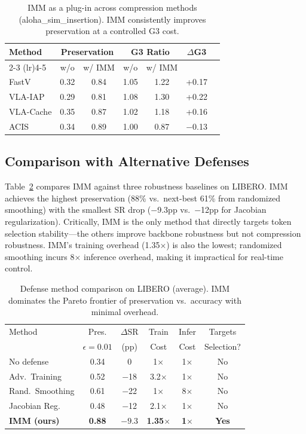 \documentclass[10pt,twocolumn]{article}
\begin{document}
\begin{table}[t]
\centering
\caption{IMM as a plug-in across compression methods (aloha\_sim\_insertion). IMM consistently improves preservation at a controlled G3 cost.}
\label{tab:plugin}
\small
\begin{tabular}{@{}lcccccc@{}}
\toprule
Method & \multicolumn{2}{c}{Preservation} & \multicolumn{2}{c}{G3 Ratio} & $\Delta$G3 \\
\cmidrule(lr){2-3} \cmidrule(lr){4-5}
 & w/o & w/ IMM & w/o & w/ IMM & \\
\midrule
FastV     & 0.32 & 0.84 & 1.05 & 1.22 & +0.17 \\
VLA-IAP   & 0.29 & 0.81 & 1.08 & 1.30 & +0.22 \\
VLA-Cache & 0.35 & 0.87 & 1.02 & 1.18 & +0.16 \\
ACIS      & 0.34 & 0.89 & 1.00 & 0.87 & $-$0.13 \\
\bottomrule
\end{tabular}
\end{table}

\subsection{Comparison with Alternative Defenses}
\label{sec:defense}

Table~\ref{tab:defense} compares IMM against three robustness baselines on LIBERO. IMM achieves the highest preservation (88\% vs.\ next-best 61\% from randomized smoothing) with the smallest SR drop ($-$9.3pp vs.\ $-$12pp for Jacobian regularization). Critically, IMM is the only method that directly targets token selection stability---the others improve backbone robustness but not compression robustness. IMM's training overhead (1.35$\times$) is also the lowest; randomized smoothing incurs 8$\times$ inference overhead, making it impractical for real-time control.

\begin{table}[t]
\centering
\caption{Defense method comparison on LIBERO (average). IMM dominates the Pareto frontier of preservation vs.\ accuracy with minimal overhead.}
\label{tab:defense}
\small
\begin{tabular}{@{}lccccc@{}}
\toprule
Method & Pres. & $\Delta$SR & Train & Infer & Targets \\
       & $\epsilon{=}0.01$ & (pp) & Cost & Cost & Selection? \\
\midrule
No defense        & 0.34 & 0    & 1$\times$    & 1$\times$   & No \\
Adv.\ Training    & 0.52 & $-$18 & 3.2$\times$  & 1$\times$   & No \\
Rand.\ Smoothing  & 0.61 & $-$22 & 1$\times$    & 8$\times$   & No \\
Jacobian Reg.     & 0.48 & $-$12 & 2.1$\times$  & 1$\times$   & No \\
\textbf{IMM (ours)} & \textbf{0.88} & $\mathbf{-9.3}$ & \textbf{1.35$\times$} & \textbf{1$\times$} & \textbf{Yes} \\
\bottomrule
\end{tabular}
\end{table}
\end{document}
